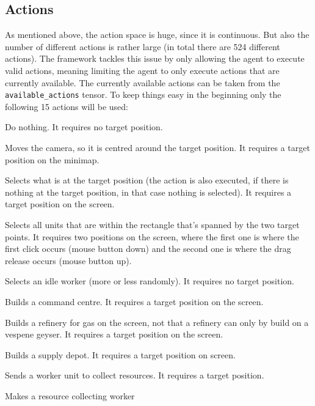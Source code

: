 \documentclass{article}
\begin{document}
\subsection{Actions}
As mentioned above, the action space is huge, since it is continuous. But also 
the number of different actions is rather large (in total there are 524 
different actions). The framework tackles this issue by only allowing the agent 
to execute valid actions, meaning limiting the agent to only execute actions 
that are currently available. The currently available actions can be taken from 
the \texttt{available\_actions} tensor. To keep things easy in the beginning 
only the following 15 actions will be used:

\begin{description}[noitemsep]
\item[\texttt{no\_op:}] Do nothing. It requires no target position.
\item[\texttt{move\_camera:}] Moves the camera, so it is centred around the 
target position. It requires a target position on the minimap.
\item[\texttt{select\_point:}] Selects what is at the target position (the 
action is also executed, if there is nothing at the target position, in that 
case nothing is selected). It requires a target position on the screen.
\item[\texttt{select\_rect:}] Selects all units that are within the rectangle 
that's spanned by the two target points. It requires two positions on the 
screen, where the first one is where the first click occurs (mouse button down) 
and the second one is where the drag release occurs (mouse button up).
\item[\texttt{select\_idle\_worker:}] Selects an idle worker (more or less 
randomly). It requires no target position.
\item[\texttt{Build\_CommandCenter\_screen":}] Builds a command centre. It 
requires a target position on the screen.
\item[\texttt{Build\_Refinery\_screen:}] Builds a refinery for gas on the 
screen, not that a refinery can only by build on a vespene geyser. It requires 
a target position on the screen.
\item[\texttt{Build\_SupplyDepot\_screen":}] Builds a supply depot. It requires 
a target position on screen.
\item[\texttt{Harvest\_Gather\_screen:}] Sends a worker unit to collect 
resources. It requires a target position.
\item[\texttt{Harvest\_Return\_quick:}] Makes a resource collecting worker 

\end{description}
\end{document}
